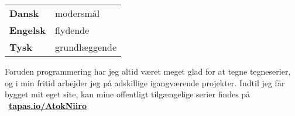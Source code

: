 \documentclass[9pt]{template/developercv}
\begin{document}
\begin{minipage}[t]{0.25\textwidth}
  \vspace{-\baselineskip}


  \begin{tabular}{ll}
    \textbf{Dansk}   & modersmål \\
    \textbf{Engelsk} & flydende  \\
    \textbf{Tysk}    & grundlæggende
  \end{tabular}
\end{minipage}
\hfill
\begin{minipage}[t]{0.7\textwidth}
  \vspace{-\baselineskip}


  Foruden programmering har jeg altid været meget glad for at tegne tegneserier, og i min fritid arbejder jeg på adskillige igangværende projekter.
  Indtil jeg får bygget mit eget site, kan mine offentligt tilgængelige serier findes på \faLink~\href{https://tapas.io/AtokNiiro/series}{\textbf{tapas.io/AtokNiiro}}
\end{minipage}
\end{document}
